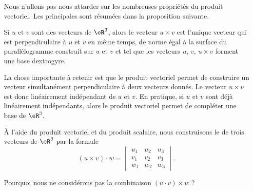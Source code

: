 Nous n'allons pas nous attarder sur les nombreuses propriétés du produit vectoriel. Les principales sont résumées dans la proposition suivante.
\begin{proposition}
	Si $u$ et $v$ sont des vecteurs de $\eR^3$, alors le vecteur $u\times v$ est l'unique vecteur qui est perpendiculaire à $u$ et $v$ en même temps, de norme égal à la surface du parallélogramme construit sur $u$ et $v$ et tel que les vecteurs $u$, $v$, $u\times v$ forment une base dextrogyre.
\end{proposition}
La chose importante à retenir est que le produit vectoriel permet de construire un vecteur simultanément perpendiculaire à deux vecteurs donnés. Le vecteur $u\times v$ est donc linéairement indépendant de $u$ et $v$. En pratique, si $u$ et $v$ sont déjà linéairement indépendants, alors le produit vectoriel permet de compléter une base de $\eR^3$.

À l'aide du produit vectoriel et du produit scalaire, nous construisons le  de trois vecteurs de $\eR^3$ par la formule
\begin{equation}
	(u\times v)\cdot w=\begin{vmatrix}
			u_1	&	u_2	&	u_3	\\
			v_1	&	v_2	&	v_3	\\
			w_1	&	w_2	&	w_3	
	\end{vmatrix}.
\end{equation}

Pourquoi nous ne considérons pas la combinaison $(u\cdot v)\times w$ ?

